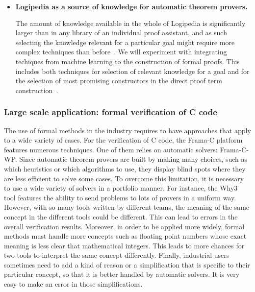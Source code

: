 \begin{itemize}
\item{\bf Logipedia as a source of knowledge for automatic theorem provers.}

  The amount of knowledge available in the whole of Logipedia is
significantly larger than in any library of an individual proof assistant,
and as such selecting the knowledge relevant for a
particular goal might require more complex techniques than
before~\cite{Irving-deepmath}.  We will experiment with integrating techiques
from machine learning to the construction of formal proofs. This includes both techniques
for selection of relevant knowledge for a goal and for the selection
of most promising constructors in the direct proof term
construction~\cite{ZielenkiewiczSchubert2016}.
\end{itemize}

\subsubsection*{Large scale application: formal verification of C code}

The use of formal methods in the industry requires to have approaches
that apply to a wide variety of cases. For the verification of C code,
the Frama-C platform features numerous techniques. One of them relies
on automatic solvers: Frama-C-WP. Since automatic theorem provers are
built by making many choices, such as which heuristics or which
algorithms to use, they display blind spots where they are less
efficient to solve some cases. To overcome this limitation, it is
necessary to use a wide variety of solvers in a portfolio manner. For
instance, the Why3 tool features the ability to send problems to lots
of provers in a uniform way. However, with so many tools written by
different teams, the meaning of the same concept in the different
tools could be different. This can lead to errors in the overall
verification results. Moreover, in order to be applied more widely,
formal methods must handle more concepts such as floating point
numbers whose exact meaning is less clear that mathematical
integers. This leads to more chances for two tools to interpret the
same concept differently. Finally, industrial users sometimes need to
add a kind of reason or a simplification that is specific to their
particular concept, so that it is better handled by automatic
solvers. It is very easy to make an error in those simplifications.

